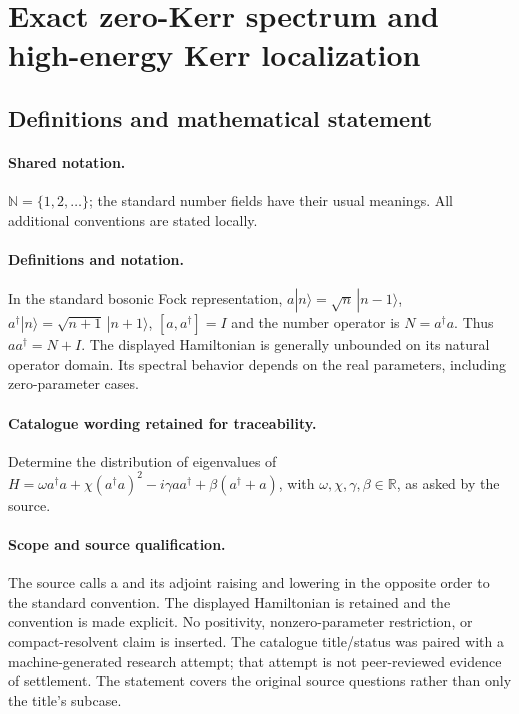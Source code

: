 \documentclass[11pt]{article}
\begin{document}
\section{Exact zero-Kerr spectrum and high-energy Kerr localization}\label{statement}

\subsection{Definitions and mathematical statement}

\paragraph{Shared notation.}$\mathbb N=\{1,2,\ldots\}$; the standard number fields have their usual meanings. All additional conventions are stated locally.


\paragraph{Definitions and notation.}In the standard bosonic Fock representation, $a|n\rangle=\sqrt n\,|n-1\rangle$, $a^\dagger|n\rangle=\sqrt{n+1}\,|n+1\rangle$, $[a,a^\dagger]=I$ and the number operator is $N=a^\dagger a$. Thus $aa^\dagger=N+I$. The displayed Hamiltonian is generally unbounded on its natural operator domain. Its spectral behavior depends on the real parameters, including zero-parameter cases.

\paragraph{Catalogue wording retained for traceability.}
Determine the distribution of eigenvalues of $H=\omega a^\dagger a+\chi(a^\dagger a)^2-i\gamma aa^\dagger+\beta(a^\dagger+a)$, with $\omega,\chi,\gamma,\beta\in\mathbb R$, as asked by the source.
\paragraph{Scope and source qualification.}The source calls a and its adjoint raising and lowering in the opposite order to the standard convention. The displayed Hamiltonian is retained and the convention is made explicit. No positivity, nonzero-parameter restriction, or compact-resolvent claim is inserted. The catalogue title/status was paired with a machine-generated research attempt; that attempt is not peer-reviewed evidence of settlement. The statement covers the original source questions rather than only the title’s subcase.
\end{document}
